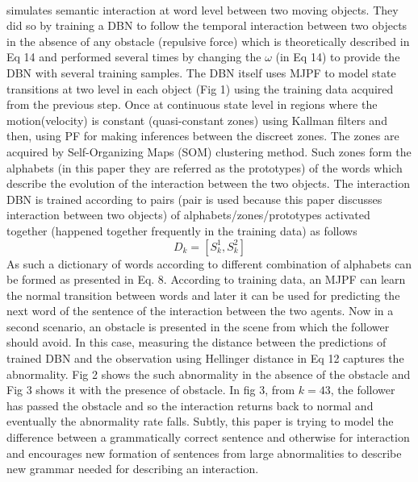 \documentclass{article}
\begin{document}
			\paragraph{\cite{baydoun-2019-prediction-of-multi-target-dynamics-using-discrete-descriptors-an-interactive-approach}} simulates semantic interaction at word level between two moving objects. They did so by training a DBN to follow the temporal interaction between two objects in the absence of any obstacle (repulsive force) which is theoretically described in Eq 14 and performed several times by changing the $\omega$ (in Eq 14) to provide the DBN with several training samples. The DBN itself uses MJPF to model state transitions at two level in each object (Fig 1) using the training data acquired from  the previous step. Once at continuous state level in regions where the motion(velocity) is constant (quasi-constant zones) using Kallman filters and then, using PF for making inferences between the discreet zones. The zones are acquired by Self-Organizing Maps (SOM) clustering method. Such zones form the alphabets (in this paper they are referred as the prototypes) of the words which describe the evolution of the interaction between the two objects. The interaction DBN is trained according to pairs (pair is used because this paper discusses interaction between two objects) of alphabets/zones/prototypes activated together (happened together frequently in the training data) as follows
			\begin{equation}
			D_k = [S_k^{1},S_k^{2}]
			\end{equation}	
			As such a dictionary of words according to different combination of alphabets can be formed as presented in Eq. 8. 
			According to training data, an MJPF can learn the normal transition between words and later it can be used for predicting the next word of the sentence of the interaction between the two agents. Now in a second scenario, an obstacle is presented in the scene from which the follower should avoid. In this case, measuring the distance between the predictions of trained DBN and the observation using Hellinger distance in Eq 12 captures the abnormality. Fig 2 shows the such abnormality in the absence of the obstacle and Fig 3 shows it with the presence of obstacle. In fig 3, from $k=43$, the follower has passed the obstacle and so the interaction returns back to normal and eventually the abnormality rate falls. Subtly, this paper is trying to model the difference between a grammatically correct sentence and otherwise for interaction and encourages new formation of sentences from large abnormalities to describe new grammar needed for describing an interaction.  
\end{document}
